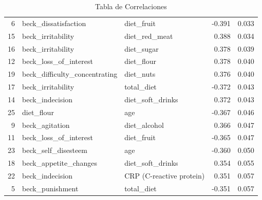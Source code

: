 \documentclass[jou]{apa7}
\begin{document}
\begin{table}[]
{\begin{tabular}{@{}rllrr@{}}
				6                    & beck\_dissatisfaction        & diet\_fruit               & -0.391                          & 0.033                        \\
				15                   & beck\_irritability           & diet\_red\_meat           & 0.388                           & 0.034                        \\
				16                   & beck\_irritability           & diet\_sugar               & 0.378                           & 0.039                        \\
				12                   & beck\_loss\_of\_interest     & diet\_flour               & 0.378                           & 0.040                        \\
				19                   & beck\_difficulty\_concentrating & diet\_nuts             & 0.376                           & 0.040                        \\
				17                   & beck\_irritability           & total\_diet               & -0.372                          & 0.043                        \\
				14                   & beck\_indecision             & diet\_soft\_drinks        & 0.372                           & 0.043                        \\
				25                   & diet\_flour                  & age                       & -0.367                          & 0.046                        \\
				9                    & beck\_agitation              & diet\_alcohol             & 0.366                           & 0.047                        \\
				11                   & beck\_loss\_of\_interest     & diet\_fruit               & -0.365                          & 0.047                        \\
				23                   & beck\_self\_disesteem        & age                       & -0.360                          & 0.050                        \\
				18                   & beck\_appetite\_changes      & diet\_soft\_drinks        & 0.354                           & 0.055                        \\
				22                   & beck\_indecision             & CRP (C-reactive protein)  & 0.351                           & 0.057                        \\
				5                    & beck\_punishment             & total\_diet               & -0.351                          & 0.057                        \\ \bottomrule
			\end{tabular}%
		}
		\caption{Tabla de Correlaciones}
		\label{tab:tableOfCorr}
	\end{table}
\end{document}
